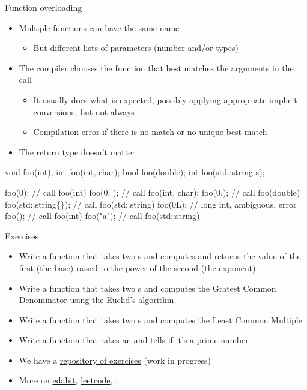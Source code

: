 \begin{frame}[fragile]{Function overloading}

  \begin{itemize}
  \item Multiple functions can have the same name
    \begin{itemize}
    \item But different lists of parameters (number and/or types)
    \end{itemize}
  \item The compiler chooses the function that best matches the arguments in
    the call
    \begin{itemize}
    \item It usually does what is expected, possibly applying appropriate
      implicit conversions, but not always
    \item Compilation error if there is no match or no unique best match
    \end{itemize}
  \item The return type doesn't matter
  \end{itemize}

  \begin{codeblock}
void foo(int);
int  foo(int, char);
bool foo(double);
int  foo(std::string s);

foo(0);             // call foo(int)
foo(0, );        // call foo(int, char);
foo(0.);            // call foo(double)
foo(std::string\{\}); // call foo(std::string)
foo(0L);            // long int, ambiguous, error
foo();           // call foo(int)
foo("a");           // call foo(std::string)\end{codeblock}

\end{frame}

\begin{frame}{Exercises}
  \begin{itemize}
  \item Write a function  that takes two s and computes and
    returns the value of the first (the base) raised to the power of the second
    (the exponent)
  \item Write a function  that takes two s and computes the
    Gratest Common Denominator using the
    \href{https://en.wikipedia.org/wiki/Euclidean_algorithm}{Euclid's algorithm}
  \item Write a function  that takes two s and computes the
    Least Common Multiple
  \item Write a function  that takes an  and tells if
    it's a prime number
  \item We have a
    \href{https://github.com/Programmazione-per-la-Fisica/exercises}{repository
      of exercises} (work in progress)
  \item More on \href{https://edabit.com/}{edabit}, \href{https://leetcode.com/}{leetcode}, \ldots
  \end{itemize}

\end{frame}


